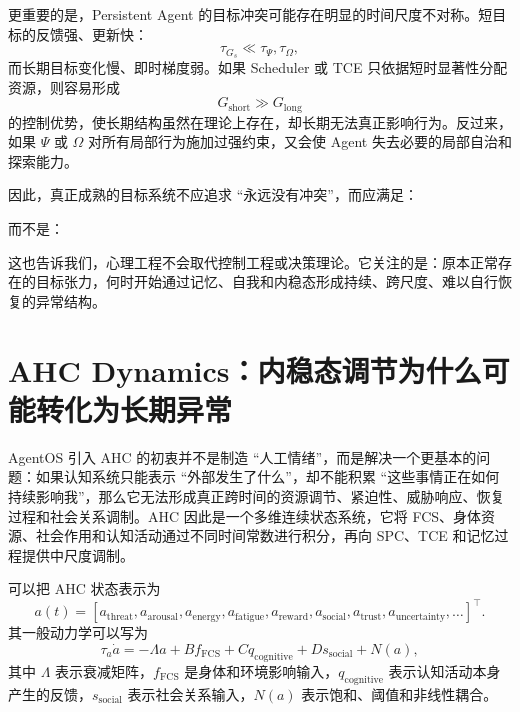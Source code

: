 更重要的是，Persistent Agent 的目标冲突可能存在明显的时间尺度不对称。短目标的反馈强、更新快：
\begin{equation}
    \tau_{G_s}\ll\tau_{\Psi},\tau_{\Omega},
\end{equation}
而长期目标变化慢、即时梯度弱。如果 Scheduler 或 TCE 只依据短时显著性分配资源，则容易形成
\begin{equation}
    G_{\mathrm{short}}
    \gg
    G_{\mathrm{long}}
\end{equation}
的控制优势，使长期结构虽然在理论上存在，却长期无法真正影响行为。反过来，如果 $\Psi$ 或 $\Omega$ 对所有局部行为施加过强约束，又会使 Agent 失去必要的局部自治和探索能力。

因此，真正成熟的目标系统不应追求 ``永远没有冲突''，而应满足：
\begin{statementbox}
\centering
{}
\end{statementbox}
而不是：
\begin{statementbox}
\centering
{}
\end{statementbox}

这也告诉我们，心理工程不会取代控制工程或决策理论。它关注的是：原本正常存在的目标张力，何时开始通过记忆、自我和内稳态形成持续、跨尺度、难以自行恢复的异常结构。

\section{AHC Dynamics：内稳态调节为什么可能转化为长期异常}
\label{sec:ahc-dynamics-psychology}

AgentOS 引入 AHC 的初衷并不是制造 ``人工情绪''，而是解决一个更基本的问题：如果认知系统只能表示 ``外部发生了什么''，却不能积累 ``这些事情正在如何持续影响我''，那么它无法形成真正跨时间的资源调节、紧迫性、威胁响应、恢复过程和社会关系调制。AHC 因此是一个多维连续状态系统，它将 FCS、身体资源、社会作用和认知活动通过不同时间常数进行积分，再向 SPC、TCE 和记忆过程提供中尺度调制。

可以把 AHC 状态表示为
\begin{equation}
    a(t)
    =
    \left[
    a_{\mathrm{threat}},
    a_{\mathrm{arousal}},
    a_{\mathrm{energy}},
    a_{\mathrm{fatigue}},
    a_{\mathrm{reward}},
    a_{\mathrm{social}},
    a_{\mathrm{trust}},
    a_{\mathrm{uncertainty}},
    \ldots
    \right]^{\top}.
\end{equation}
其一般动力学可以写为
\begin{equation}
    \tau_a\dot a
    =
    -\Lambda a
    +
    Bf_{\mathrm{FCS}}
    +
    Cq_{\mathrm{cognitive}}
    +
    Ds_{\mathrm{social}}
    +
    N(a),
\end{equation}
其中 $\Lambda$ 表示衰减矩阵，$f_{\mathrm{FCS}}$ 是身体和环境影响输入，$q_{\mathrm{cognitive}}$ 表示认知活动本身产生的反馈，$s_{\mathrm{social}}$ 表示社会关系输入，$N(a)$ 表示饱和、阈值和非线性耦合。

